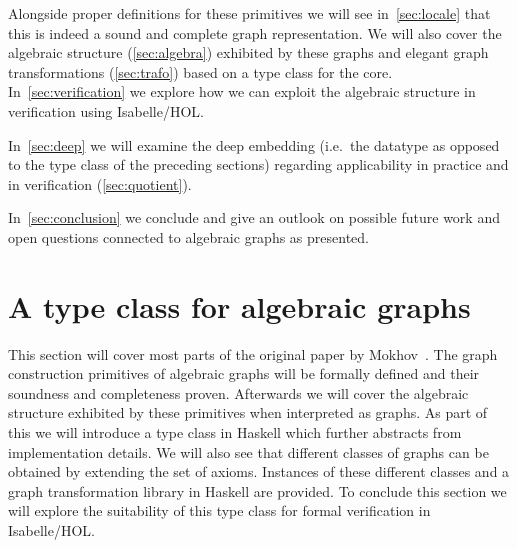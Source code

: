 \documentclass{article}
\begin{document}
Alongside proper definitions for these primitives we will see
in~\autoref{sec:locale} that this is indeed a sound and complete graph
representation. We will also cover the algebraic structure (\ref{sec:algebra})
exhibited by these graphs and elegant graph transformations (\ref{sec:trafo})
based on a type class for the core. In~\autoref{sec:verification} we explore how
we can exploit the algebraic structure in verification using Isabelle/HOL.

In~\autoref{sec:deep} we will examine the deep embedding (i.e.\
the datatype as opposed to the type class of the preceding sections) regarding
applicability in practice and in verification (\autoref{sec:quotient}). 

In~\autoref{sec:conclusion} we conclude and give an outlook on possible future
work and open questions connected to algebraic graphs as presented.

\section{A type class for algebraic graphs}\label{sec:locale}
This section will cover most parts of the original paper by
Mokhov~\cite{mokhov2017algebraic}. The graph construction primitives of
algebraic graphs will be formally defined and their soundness and completeness
proven. Afterwards we will cover the algebraic structure exhibited by these
primitives when interpreted as graphs. As part of this we will introduce a type class in Haskell which
further abstracts from implementation details. We will also see that different
classes of graphs can be obtained by extending the set of axioms. Instances of
these different classes and a graph transformation library in Haskell are
provided. To conclude this section we will explore the suitability of this type
class for formal verification in Isabelle/HOL.
\end{document}

